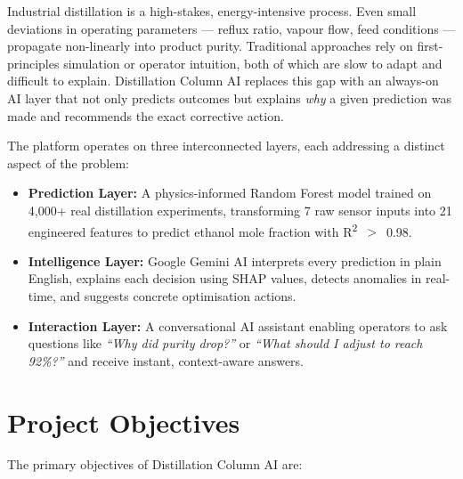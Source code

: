 \documentclass[12pt,a4paper]{report}
\begin{document}
Industrial distillation is a high-stakes, energy-intensive process. Even small
deviations in operating parameters — reflux ratio, vapour flow, feed conditions —
propagate non-linearly into product purity. Traditional approaches rely on first-principles
simulation or operator intuition, both of which are slow to adapt and difficult to
explain. Distillation Column AI replaces this gap with an always-on AI layer that not
only predicts outcomes but explains \emph{why} a given prediction was made and
recommends the exact corrective action.

The platform operates on three interconnected layers, each addressing a distinct aspect
of the problem:

\begin{itemize}[leftmargin=1.5cm]
  \item \textbf{Prediction Layer:} A physics-informed Random Forest model trained on
  4{,}000+ real distillation experiments, transforming 7 raw sensor inputs into
  21 engineered features to predict ethanol mole fraction with R\textsuperscript{2}~$>$~0.98.

  \item \textbf{Intelligence Layer:} Google Gemini AI interprets every prediction in
  plain English, explains each decision using SHAP values, detects anomalies in
  real-time, and suggests concrete optimisation actions.

  \item \textbf{Interaction Layer:} A conversational AI assistant enabling operators
  to ask questions like \textit{``Why did purity drop?''} or \textit{``What should
  I adjust to reach 92\%?''} and receive instant, context-aware answers.
\end{itemize}

\section{Project Objectives}

The primary objectives of Distillation Column AI are:
\end{document}
